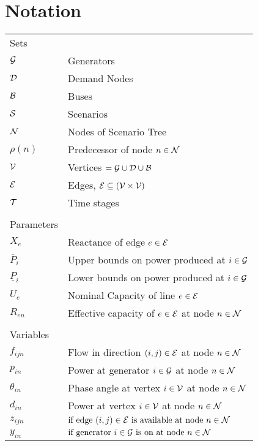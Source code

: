 
\section*{Notation}
\begin{tabular}{ l l }
Sets & \\
$ \mathcal{G} $  &  Generators  \\
$ \mathcal{D} $  & Demand Nodes \\
$ \mathcal{B}  $ &  Buses \\
$ \mathcal{S}  $  & Scenarios \\
$ \mathcal{N}  $  & Nodes of Scenario Tree\\
$\rho \left( n \right) $  & Predecessor of node $ n \in \mathcal{N} $  \\
$ \mathcal{V}  $ &  Vertices $ = \mathcal{G} \cup \mathcal{D} \cup \mathcal{B} $  \\
$ \mathcal{E}  $  & Edges, $ \mathcal{E} \subseteq (\mathcal{V} \times \mathcal{V} )$ \\
$ \mathcal{T} $ & Time stages\\
 & \\
Parameters & \\
 $X_e $  & Reactance of edge $e \in \mathcal{E}$  \\
$ \overline{P}_i $ & Upper bounds on power produced at $ i \in \mathcal{G} $  \\
$ \underline{P}_i $ & Lower bounds on power produced at $ i \in \mathcal{G} $  \\
$ U_{e} $ & Nominal Capacity of line $e \in \mathcal{E}$  \\
$ R_{en} $  & Effective capacity of $e \in \mathcal{E}$ at node $n \in \mathcal{N}$  \\
 & \\
Variables & \\

$f_{ijn}$ & Flow in direction $(i,j) \in \mathcal{E}$ at node $ n \in \mathcal{N} $  \\
$p_{in} $ & Power at generator $i \in \mathcal{G}$ at node $n \in \mathcal{N}$  \\
$\theta_{in} $ &  Phase angle at vertex $i \in \mathcal{V}$ at node $n \in \mathcal{N}$  \\
$d_{in} $ &  Power at vertex $i \in \mathcal{V}$ at node $n \in \mathcal{N}$  \\
$z_{ijn}  $ & $  \mbox{if edge } (i,j) \in \mathcal{E} \mbox{ is available at node } n \in \mathcal{N} $ \\
$y_{in} $ & $  \mbox{if generator } i \in \mathcal{G} \mbox{ is on at node } n \in \mathcal{N} $ \\  
		

\end{tabular}
